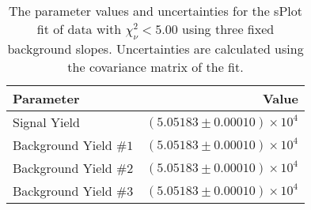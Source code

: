 
\begin{table}[h]
    \begin{center}
        \begin{tabular}{lr}\toprule
            Parameter & Value \\\midrule
            Signal Yield & $(5.05183 \pm 0.00010) \times 10^{4}$ \\
            Background Yield $\#1$ & $(5.05183 \pm 0.00010) \times 10^{4}$ \\
            Background Yield $\#2$ & $(5.05183 \pm 0.00010) \times 10^{4}$ \\
            Background Yield $\#3$ & $(5.05183 \pm 0.00010) \times 10^{4}$ \\\bottomrule
        \end{tabular}
        \caption{The parameter values and uncertainties for the sPlot fit of data with $\chi^2_\nu < 5.00$ using three fixed background slopes. Uncertainties are calculated using the covariance matrix of the fit.}
    \end{center}
\end{table}

